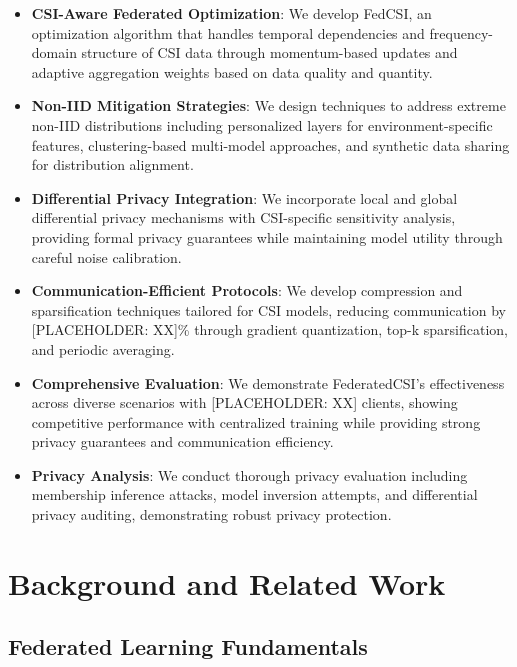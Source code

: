 \documentclass[journal]{IEEEtran}
\begin{document}
\begin{itemize}
\item \textbf{CSI-Aware Federated Optimization}: We develop FedCSI, an optimization algorithm that handles temporal dependencies and frequency-domain structure of CSI data through momentum-based updates and adaptive aggregation weights based on data quality and quantity.

\item \textbf{Non-IID Mitigation Strategies}: We design techniques to address extreme non-IID distributions including personalized layers for environment-specific features, clustering-based multi-model approaches, and synthetic data sharing for distribution alignment.

\item \textbf{Differential Privacy Integration}: We incorporate local and global differential privacy mechanisms with CSI-specific sensitivity analysis, providing formal privacy guarantees while maintaining model utility through careful noise calibration.

\item \textbf{Communication-Efficient Protocols}: We develop compression and sparsification techniques tailored for CSI models, reducing communication by [PLACEHOLDER: XX]\% through gradient quantization, top-k sparsification, and periodic averaging.

\item \textbf{Comprehensive Evaluation}: We demonstrate FederatedCSI's effectiveness across diverse scenarios with [PLACEHOLDER: XX] clients, showing competitive performance with centralized training while providing strong privacy guarantees and communication efficiency.

\item \textbf{Privacy Analysis}: We conduct thorough privacy evaluation including membership inference attacks, model inversion attempts, and differential privacy auditing, demonstrating robust privacy protection.
\end{itemize}

\section{Background and Related Work}

\subsection{Federated Learning Fundamentals}
\end{document}

